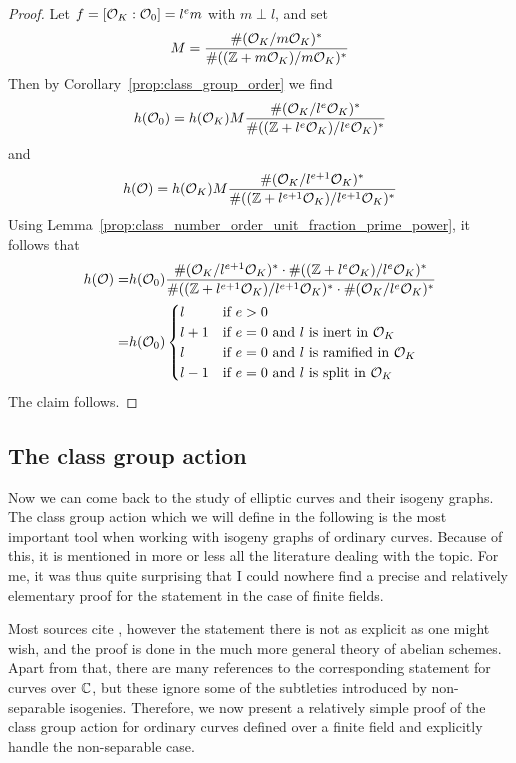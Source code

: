 \begin{proof}
    Let $f = [\mathcal{O}_K : \mathcal{O}_0] = l^e m$ with $m \perp l$, and set
    \begin{equation*}
        M = \frac {\#(\mathcal{O}_K/m\mathcal{O}_K)^*} {\#((\mathbb{Z} + m\mathcal{O}_K)/m\mathcal{O}_K)^*}
    \end{equation*}
    Then by Corollary~\ref{prop:class_group_order} we find
    \begin{equation*}
        h(\mathcal{O}_0) = h(\mathcal{O}_K) M \frac {\#(\mathcal{O}_K/l^e\mathcal{O}_K)^*} {\#((\mathbb{Z} + l^e\mathcal{O}_K)/l^e\mathcal{O}_K)^*}
    \end{equation*}
    and
    \begin{equation*}
        h(\mathcal{O}) = h(\mathcal{O}_K) M \frac {\#(\mathcal{O}_K/l^{e + 1}\mathcal{O}_K)^*} {\#((\mathbb{Z} + l^{e + 1}\mathcal{O}_K)/l^{e + 1}\mathcal{O}_K)^*}
    \end{equation*}
    Using Lemma~\ref{prop:class_number_order_unit_fraction_prime_power}, it follows that
    \begin{align*}
        h(\mathcal{O}) =& h(\mathcal{O}_0) \frac {\#(\mathcal{O}_K/l^{e + 1}\mathcal{O}_K)^* \cdot \#((\mathbb{Z} + l^e\mathcal{O}_K)/l^e\mathcal{O}_K)^*} {\#((\mathbb{Z} + l^{e + 1}\mathcal{O}_K)/l^{e + 1}\mathcal{O}_K)^* \cdot \#(\mathcal{O}_K/l^e\mathcal{O}_K)^*} \\
        =& h(\mathcal{O}_0) \begin{cases}
            l & \text{if $e > 0$} \\
            l + 1 & \text{if $e = 0$ and $l$ is inert in $\mathcal{O}_K$} \\
            l & \text{if $e = 0$ and $l$ is ramified in $\mathcal{O}_K$} \\
            l - 1 & \text{if $e = 0$ and $l$ is split in $\mathcal{O}_K$}
        \end{cases}
    \end{align*}
    The claim follows.
\end{proof}

\subsection{The class group action}
Now we can come back to the study of elliptic curves and their isogeny graphs.
The class group action which we will define in the following is the most important tool when working with isogeny graphs of ordinary curves.
Because of this, it is mentioned in more or less all the literature dealing with the topic.
For me, it was thus quite surprising that I could nowhere find a precise and relatively elementary proof for the statement in the case of finite fields.

Most sources cite \cite[Thm~4.5]{class_group_action_waterhouse}, however the statement there is not as explicit as one might wish, and the proof is done in the much more general theory of abelian schemes.
Apart from that, there are many references to the corresponding statement for curves over $\mathbb{C}$, but these ignore some of the subtleties introduced by non-separable isogenies. 
Therefore, we now present a relatively simple proof of the class group action for ordinary curves defined over a finite field and explicitly handle the non-separable case.

